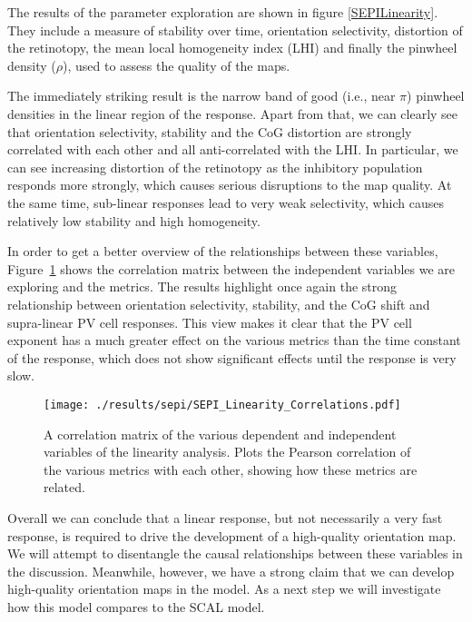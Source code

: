 The results of the parameter exploration are shown in figure
\ref{SEPILinearity}. They include a measure of stability over time,
orientation selectivity, distortion of the retinotopy, the mean local
homogeneity index (LHI) and finally the pinwheel density ($\rho$),
used to assess the quality of the maps.

The immediately striking result is the narrow band of good (i.e., near
$\pi$) pinwheel densities in the linear region of the response. Apart
from that, we can clearly see that orientation selectivity, stability
and the CoG distortion are strongly correlated with each other and all
anti-correlated with the LHI. In particular, we can see increasing
distortion of the retinotopy as the inhibitory population responds
more strongly, which causes serious disruptions to the map quality. At
the same time, sub-linear responses lead to very weak selectivity,
which causes relatively low stability and high homogeneity.

In order to get a better overview of the relationships between these
variables, Figure~\ref{SEPILinearityCorr} shows the correlation matrix
between the independent variables we are exploring and the
metrics. The results highlight once again the strong relationship
between orientation selectivity, stability, and the CoG shift and
supra-linear PV cell responses. This view makes it clear that the PV
cell exponent has a much greater effect on the various metrics than
the time constant of the response, which does not show significant
effects until the response is very slow.

\begin{figure}
	\centering
    \texttt{[image: ./results/sepi/SEPI\_Linearity\_Correlations.pdf]}
	\caption{A correlation matrix of the various dependent and
      independent variables of the linearity analysis. Plots the
      Pearson correlation of the various metrics with each other,
      showing how these metrics are related.}
	\label{SEPILinearityCorr}
\end{figure}

Overall we can conclude that a linear response, but not necessarily a
very fast response, is required to drive the development of a
high-quality orientation map. We will attempt to disentangle the
causal relationships between these variables in the
discussion. Meanwhile, however, we have a strong claim that we can develop
high-quality orientation maps in the model. As a next step we will
investigate how this model compares to the SCAL model.

